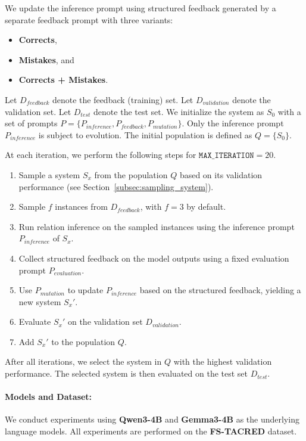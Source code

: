 \documentclass[12pt]{article}
\begin{document}
We update the inference prompt using structured feedback generated by a separate feedback prompt with three variants:
\begin{itemize}
    \item \textbf{Corrects},
    \item \textbf{Mistakes}, and
    \item \textbf{Corrects + Mistakes}.
\end{itemize}


Let $D_{feedback}$ denote the feedback (training) set.
Let $D_{validation}$ denote the validation set.
Let $D_{test}$ denote the test set.
We initialize the system as $S_0$ with a set of prompts
\(
P = \{P_{inference}, P_{feedback}, P_{mutation}\}.
\)
Only the inference prompt $P_{inference}$ is subject to evolution.
The initial population is defined as $Q = \{S_0\}$.


At each iteration, we perform the following steps for $\texttt{MAX\_ITERATION}=20$.

\begin{enumerate}
    \item Sample a system $S_x$ from the population $Q$ based on its validation performance (see Section~\ref{subsec:sampling_system}).
    \item Sample $f$ instances from $D_{feedback}$, with $f=3$ by default.
    \item Run relation inference on the sampled instances using the inference prompt $P_{inference}$ of $S_x$.
    \item Collect structured feedback on the model outputs using a fixed evaluation prompt $P_{evaluation}$.
    \item Use $P_{mutation}$ to update $P_{inference}$ based on the structured feedback, yielding a new system $S_x'$.
    \item Evaluate $S_x'$ on the validation set $D_{validation}$.
    \item Add $S_x'$ to the population $Q$.
\end{enumerate}

After all iterations, we select the system in $Q$ with the highest validation performance.
The selected system is then evaluated on the test set $D_{test}$.

\paragraph{Models and Dataset:}
We conduct experiments using \textbf{Qwen3-4B} and \textbf{Gemma3-4B} as the underlying language models.
All experiments are performed on the \textbf{FS-TACRED} dataset.
\end{document}
